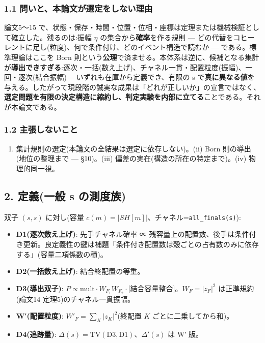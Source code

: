 \documentclass[
]{ltjsarticle}
\providecommand{\tightlist}{%
  \setlength{\itemsep}{0pt}\setlength{\parskip}{0pt}}
\begin{document}
\subsubsection{1.1
問いと、本論文が選定をしない理由}\label{ux554fux3044ux3068ux672cux8ad6ux6587ux304cux9078ux5b9aux3092ux3057ux306aux3044ux7406ux7531}

論文5〜15
で、状態・保存・時間・位置・位相・座標は定理または機械検証として確立した。残るのは:振幅
\(\eta\) の集合から\textbf{確率}を作る規則 ---
どの代替をコヒーレントに足し(粒度)、何で条件付け、どのイベント構造で読むか
--- である。標準理論はここを Born
則という\textbf{公理}で済ませる。本体系は逆に、候補となる集計が\textbf{導出できすぎる}:逐次・一括(数え上げ)、チャネル一貫・配置粒度(振幅)、一回・逐次(結合振幅)---
いずれも在庫から定義でき、有限の s
で\textbf{真に異なる値}を与える。したがって現段階の誠実な成果は「どれが正しいか」の宣言ではなく、\textbf{選定問題を有限の決定構造に縮約し、判定実験を内部に立てる}ことである。それが本論文である。

\subsubsection{1.2
主張しないこと}\label{ux4e3bux5f35ux3057ux306aux3044ux3053ux3068}

\begin{enumerate}
\def\labelenumi{(\roman{enumi})}
\tightlist
\item
  集計規則の選定(本論文の全結果は選定に依存しない)。(ii) Born
  則の導出(地位の整理まで --- §10)。(iii)
  偏差の実在(構造の所在の特定まで)。(iv) 物理的同一視。
\end{enumerate}

\subsection{2. 定義(一般 s
の測度族)}\label{ux5b9aux7fa9ux4e00ux822c-s-ux306eux6e2cux5ea6ux65cf}

双子 \((s,s)\) に対し(容量
\(c(m)=|SH[m]|\)、チャネル=\texttt{all\_finals(s)}):

\begin{itemize}
\tightlist
\item
  \textbf{D1(逐次数え上げ)}: 先手チャネル確率 ∝
  残容量上の配置数、後手は条件付き更新。良定義性の鍵は補題「条件付き配置数は殻ごとの占有数のみに依存する」(容量二項係数の積)。
\item
  \textbf{D2(一括数え上げ)}: 結合終配置の等重。
\item
  \textbf{D3(導出双子)}:
  \(P\propto \mathrm{mult}\cdot W_{F_1}W_{F_2}\cdot[\)結合容量整合\(]\)。\(W_F=|z_F|^2\)
  は正準規約(論文14 定理5)のチャネル一貫振幅。
\item
  \textbf{W′(配置粒度)}: \(W'_F=\sum_K|z_K|^2\)(終配置 \(K\)
  ごとに二乗してから和)。
\item
  \textbf{D4(追跡量)}:
  \(\Delta(s)=\mathrm{TV}(\text{D3},\text{D1})\)、\(\Delta'(s)\) は W′
  版。
\end{itemize}
\end{document}
